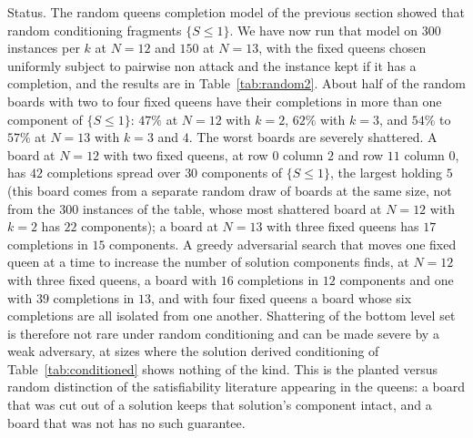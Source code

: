 Status. The random queens completion model of the previous section showed that random conditioning fragments $\{ S \le 1 \}$. We have now run that model on $300$ instances per $k$ at $N = 12$ and $150$ at $N = 13$, with the fixed queens chosen uniformly subject to pairwise non attack and the instance kept if it has a completion, and the results are in Table~\ref{tab:random2}. About half of the random boards with two to four fixed queens have their completions in more than one component of $\{ S \le 1 \}$: $47\%$ at $N = 12$ with $k = 2$, $62\%$ with $k = 3$, and $54\%$ to $57\%$ at $N = 13$ with $k = 3$ and $4$. The worst boards are severely shattered. A board at $N = 12$ with two fixed queens, at row $0$ column $2$ and row $11$ column $0$, has $42$ completions spread over $30$ components of $\{ S \le 1 \}$, the largest holding $5$ (this board comes from a separate random draw of boards at the same size, not from the $300$ instances of the table, whose most shattered board at $N = 12$ with $k = 2$ has $22$ components); a board at $N = 13$ with three fixed queens has $17$ completions in $15$ components. A greedy adversarial search that moves one fixed queen at a time to increase the number of solution components finds, at $N = 12$ with three fixed queens, a board with $16$ completions in $12$ components and one with $39$ completions in $13$, and with four fixed queens a board whose six completions are all isolated from one another. Shattering of the bottom level set is therefore not rare under random conditioning and can be made severe by a weak adversary, at sizes where the solution derived conditioning of Table~\ref{tab:conditioned} shows nothing of the kind. This is the planted versus random distinction of the satisfiability literature appearing in the queens: a board that was cut out of a solution keeps that solution's component intact, and a board that was not has no such guarantee.

